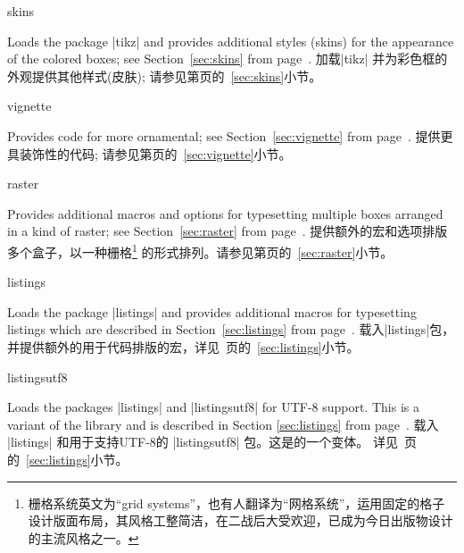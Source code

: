 \begin{docTcbKey}[library]{skins}{}{}
\begin{stripedbox}
Loads the package |tikz| %
and provides additional styles (skins) for the appearance of the colored boxes; 
see  Section~\ref{sec:skins} from page~\pageref{sec:skins}.
\tcblower
加载|tikz|\makebox[0pt]{~}%
并为彩色框的外观提供其他样式(皮肤);
请参见第\pageref{sec:skins}页的~\ref{sec:skins}小节。
\end{stripedbox}
\end{docTcbKey}

\begin{docTcbKey}[library]{vignette}{}{}
\begin{stripedbox}
Provides code for more ornamental; see
Section~\ref{sec:vignette} from page~\pageref{sec:vignette}.
\tcblower
提供更具装饰性的代码; 请参见第\pageref{sec:vignette}页的~\ref{sec:vignette}小节。
\end{stripedbox}
\end{docTcbKey}

\begin{docTcbKey}[library]{raster}{}{}
\begin{stripedbox}
Provides additional macros and options for typesetting 
multiple boxes arranged in a kind of raster;
see Section~\ref{sec:raster} from page~\pageref{sec:raster}.
\tcblower
提供额外的宏和选项排版多个盒子，以一种栅格\footnote{栅格系统英文为“grid systems”，也有人翻译为“网格系统”，运用固定的格子设计版面布局，其风格工整简洁，在二战后大受欢迎，已成为今日出版物设计的主流风格之一。}%
的形式排列。请参见第\pageref{sec:raster}页的~\ref{sec:raster}小节。
\end{stripedbox}
\end{docTcbKey}


\begin{docTcbKey}[library]{listings}{}{}
\begin{stripedbox}
Loads the package |listings| %
and provides additional macros for typesetting listings which are described in Section~\ref{sec:listings} from page~\pageref{sec:listings}.
\tcblower
载入|listings|包，并提供额外的用于代码排版的宏，详见~\pageref{sec:listings}页的~\ref{sec:listings}小节。
\end{stripedbox}
\end{docTcbKey}

\begin{docTcbKey}[library]{listingsutf8}{}{}
\begin{stripedbox}
Loads the packages |listings| %
 and |listingsutf8| %
  for UTF-8 support.
This is a variant of the library 
and is described in Section \ref{sec:listings}
from page~\pageref{sec:listings}.
\tcblower
载入 |listings| 和用于支持UTF-8的 |listingsutf8| 包。这是的一个变体。%
详见~\pageref{sec:listings}页的~\ref{sec:listings}小节。
\end{stripedbox}
\end{docTcbKey}



